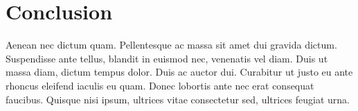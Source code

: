 \section{Conclusion}
Aenean nec dictum quam. Pellentesque ac massa sit amet dui gravida dictum. Suspendisse ante tellus, blandit in euismod nec, venenatis vel diam. Duis ut massa diam, dictum tempus dolor. Duis ac auctor dui. Curabitur ut justo eu ante rhoncus eleifend iaculis eu quam. Donec lobortis ante nec erat consequat faucibus. Quisque nisi ipsum, ultrices vitae consectetur sed, ultrices feugiat urna.